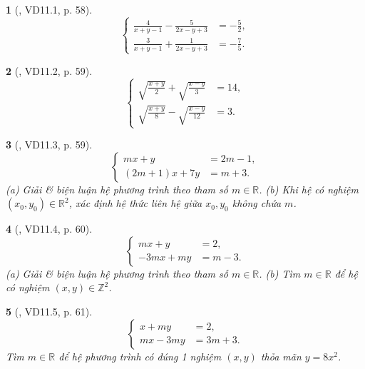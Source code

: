 \documentclass{article}
\newtheorem{baitoan}{}
\begin{document}
\begin{baitoan}[\cite{TLCT_THCS_Toan_9_dai_so}, VD11.1, p. 58]
	\begin{equation*}
		\left\{\begin{split}
			\frac{4}{x + y - 1} - \frac{5}{2x - y + 3} &= -\frac{5}{2},\\
			\frac{3}{x + y - 1} + \frac{1}{2x - y + 3} &= -\frac{7}{5}.
		\end{split}\right.
	\end{equation*}
\end{baitoan}

\begin{baitoan}[\cite{TLCT_THCS_Toan_9_dai_so}, VD11.2, p. 59]
	\begin{equation*}
		\left\{\begin{split}
			\sqrt{\frac{x + y}{2}} + \sqrt{\frac{x - y}{3}} &= 14,\\
			\sqrt{\frac{x + y}{8}} - \sqrt{\frac{x - y}{12}} &= 3.
		\end{split}\right.
	\end{equation*}
\end{baitoan}

\begin{baitoan}[\cite{TLCT_THCS_Toan_9_dai_so}, VD11.3, p. 59]
	\begin{equation*}
		\left\{\begin{split}
			mx + y &= 2m - 1,\\
			(2m + 1)x + 7y &= m + 3.
		\end{split}\right.
	\end{equation*}
	(a) Giải \& biện luận hệ phương trình theo tham số $m\in\mathbb{R}$. (b) Khi hệ có nghiệm $(x_0,y_0)\in\mathbb{R}^2$, xác định hệ thức liên hệ giữa $x_0,y_0$ không chứa $m$.
\end{baitoan}

\begin{baitoan}[\cite{TLCT_THCS_Toan_9_dai_so}, VD11.4, p. 60]
	\begin{equation*}
		\left\{\begin{split}
			mx + y &= 2,\\
			-3mx + my &= m - 3.
		\end{split}\right.
	\end{equation*}
	(a) Giải \& biện luận hệ phương trình theo tham số $m\in\mathbb{R}$. (b) Tìm $m\in\mathbb{R}$ để hệ có nghiệm $(x,y)\in\mathbb{Z}^2$.
\end{baitoan}

\begin{baitoan}[\cite{TLCT_THCS_Toan_9_dai_so}, VD11.5, p. 61]
	\begin{equation*}
		\left\{\begin{split}
			x + my &= 2,\\
			mx - 3my &= 3m + 3.
		\end{split}\right.
	\end{equation*}
	Tìm $m\in\mathbb{R}$ để hệ phương trình có đúng 1 nghiệm $(x,y)$ thỏa mãn $y = 8x^2$.
\end{baitoan}
\end{document}
